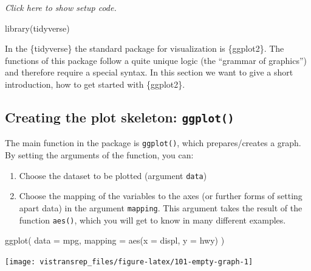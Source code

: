 \documentclass[]{book}
\newenvironment{Shaded}{}{}
\newcommand{\DataTypeTok}[1]{#1}
\newcommand{\KeywordTok}[1]{\textcolor[rgb]{0.00,0.00,1.00}{#1}}
\newcommand{\NormalTok}[1]{#1}
\providecommand{\tightlist}{%
  \setlength{\itemsep}{0pt}\setlength{\parskip}{0pt}}
\begin{document}
\emph{Click here to show setup code.}

\begin{Shaded}
\begin{Highlighting}[]
\KeywordTok{library}\NormalTok{(tidyverse)}
\end{Highlighting}
\end{Shaded}

In the \{tidyverse\} the standard package for visualization is \{ggplot2\}.
The functions of this package follow a quite unique logic (the ``grammar of graphics'') and therefore require a special syntax.
In this section we want to give a short introduction, how to get started with \{ggplot2\}.

\hypertarget{creating-the-plot-skeleton-ggplot}{%
\subsection{\texorpdfstring{Creating the plot skeleton: \texttt{ggplot()}}{Creating the plot skeleton: ggplot()}}\label{creating-the-plot-skeleton-ggplot}}

The main function in the package is \texttt{ggplot()}, which prepares/creates a graph.
By setting the arguments of the function, you can:

\begin{enumerate}
\def\labelenumi{\arabic{enumi}.}
\tightlist
\item
  Choose the dataset to be plotted (argument \texttt{data})
\item
  Choose the mapping of the variables to the axes (or further forms of setting apart data) in the argument \texttt{mapping}.
  This argument takes the result of the function \texttt{aes()}, which you will get to know in many different examples.
\end{enumerate}

\begin{Shaded}
\begin{Highlighting}[]
\KeywordTok{ggplot}\NormalTok{(}
  \DataTypeTok{data =}\NormalTok{ mpg,}
  \DataTypeTok{mapping =} \KeywordTok{aes}\NormalTok{(}\DataTypeTok{x =}\NormalTok{ displ, }\DataTypeTok{y =}\NormalTok{ hwy)}
\NormalTok{)}
\end{Highlighting}
\end{Shaded}

\begin{flushright}\texttt{[image: vistransrep\_files/figure-latex/101-empty-graph-1]} \end{flushright}
\end{document}
